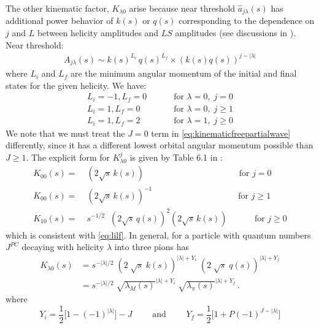 \documentclass[10pt, aps,prd,amsmath,amssymb,superscriptaddress,onecolumn,
nofootinbib,showpacs,preprintnumbers]{revtex4-1}
\newcommand{\mand}{\qquad \text{ and } \qquad}
\begin{document}
The other kinematic factor, \(K_{\lambda0}\) arise  because near threshold \(\hat{a}_{j\lambda}(s)\) has additional power behavior of \(k(s)\) or \(q(s)\) corresponding to the dependence on \(j\) and \(L\) between helicity amplitudes and \(LS\) amplitudes (see discussions in \cite{Jackson1968,Franklin1966}). Near threshold:
  \begin{gather}
    A_{j\lambda}(s) \sim k(s)^{L_i} \, q(s)^{L_f} \times (k(s)q(s))^{j- |\lambda|}
  \end{gather}
where \(L_i\) and \(L_f\) are the minimum angular momentum of the initial and final states for the given helicity. We have:
  \begin{align}
      L_i = -1, L_f = 0 &\qquad  \text{ for } \lambda = 0, \; j = 0   \nonumber \\
      L_i = 1, L_f = 0 &\qquad  \text{ for } \lambda = 0, \;  j \label{eq:lilf} \geq 1  \\
      L_i = 1 , L_f = 2& \qquad  \text{ for } \lambda = 1, \; j \geq 0 \nonumber
  \end{align}
We note that we must treat the \(J=0\) term in \cref{eq:kinematicfreepartialwave} differently, since it has a different lowest orbital angular momentum possible than \(J\geq 1\). The explicit form for \(K^j_{\lambda0}\) is given by Table 6.1 in \cite{Collins}:
  \begin{align}
    \label{eq:k-factor}
    K_{00}(s) =& \;  ( 2\sqrt{s} \, k(s)) \qquad \qquad \qquad \quad \; \, \; \qquad \quad
    \text{  for } j=0 \nonumber \\
    K_{00 }(s) =& \; ( 2\sqrt{s} \, k(s))^{-1} \qquad \qquad \qquad \quad \qquad \quad
    \text{for } j\geq 1\\ \nonumber
    K_{10}(s) =& \; s^{-1/2} \;\; (2  \sqrt{s} \, q(s))^2  (2  \sqrt{s} \, k(s)) \qquad \; \; \;\text{ for } j\geq 0
  \end{align}
which is consistent with \cref{eq:lilf}. In general, for a particle with quantum numbers \(J^{PC}\) decaying with helicity \(\lambda\) into three pions has
  \begin{align}
    K_{\lambda 0}(s) &=  s^{-|\lambda|/2} \; (2 \; \sqrt{s} \; k(s))^{|\lambda| + Y_i} \; (2 \; \sqrt{s} \; q(s))^{|\lambda| + Y_f} \nonumber \\
    &=  s^{-|\lambda|/2} \; \sqrt{\lambda_M(s)}^{|\lambda| + Y_i} \; \sqrt{\lambda_\pi(s)}^{|\lambda| + Y_f}\, .
  \end{align}
where
  \begin{equation}
    Y_i =  \frac{1}{2} \big[ 1 - (-1)^{|\lambda|}\big] - J \mand Y_f =  \frac{1}{2} \big[ 1 + P (-1)^{J- |\lambda|}]
  \end{equation}
\end{document}
